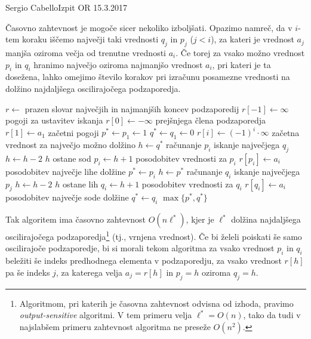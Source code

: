 \begin{naloga}{Sergio Cabello}{Izpit OR 15.3.2017}
\begin{odgovor}
Časovno zahtevnost je mogoče sicer nekoliko izboljšati.
Opazimo namreč, da v $i$-tem koraku
iščemo največji taki vrednosti $q_j$ in $p_j$ ($j < i$),
za kateri je vrednost $a_j$ manjša oziroma večja od trenutne vrednosti $a_i$.
Če torej za vsako možno vrednost $p_i$ in $q_i$
hranimo največjo oziroma najmanjšo vrednost $a_i$,
pri kateri je ta dosežena,
lahko omejimo število korakov pri izračunu posamezne vrednosti
na dolžino najdaljšega oscilirajočega podzaporedja.
\begin{small}
\begin{algorithmic}
	\State $r \gets$ prazen slovar največjih in najmanjših koncev podzaporedij
	\State $r[-1] \gets \infty$ \hfill pogoji za ustavitev iskanja
	\State $r[0] \gets -\infty$ \hfill prejšnjega člena podzaporedja
	\State $r[1] \gets a_1$ \hfill začetni pogoji
	\State $p^* \gets p_1 \gets 1$
	\State $q^* \gets q_1 \gets 0$
		\State $r[i] \gets (-1)^i \cdot \infty$
			\hfill začetna vrednost za največjo možno dolžino
		\State $h \gets q^*$ \hfill računanje $p_i$
		 \hfill iskanje največjega $q_j$
			\State $h \gets h - 2$ \hfill $h$ ostane sod
		\EndWhile
		\State $p_i \gets h + 1$
		 \hfill posodobitev vrednosti za $p_i$
			\State $r[p_i] \gets a_i$
		\EndIf
		 \hfill posodobitev največje lihe dolžine
			\State $p^* \gets p_i$
		\EndIf
		\State $h \gets p^*$ \hfill računanje $q_i$
		 \hfill iskanje največjega $p_j$
			\State $h \gets h - 2$ \hfill $h$ ostane lih
		\EndWhile
		\State $q_i \gets h + 1$
		 \hfill posodobitev vrednosti za $q_i$
			\State $r[q_i] \gets a_i$
		\EndIf
		 \hfill posodobitev največje sode dolžine
			\State $q^* \gets q_i$
		\EndIf
	\EndFor
	\State \Return $\max\{p^*, q^*\}$
\EndFunction
\end{algorithmic}
\end{small}
Tak algoritem ima časovno zahtevnost $O(n\ell^*)$,
kjer je $\ell^*$ dolžina najdaljšega oscilirajočega podzaporedja\footnote{%
Algoritmom, pri katerih je časovna zahtevnost odvisna od izhoda,
pravimo {\em output-sensitive} algoritmi.
V tem primeru velja $\ell^* = O(n)$,
tako da tudi v najslabšem primeru zahtevnost algoritma ne preseže $O(n^2)$.%
}
(tj., vrnjena vrednost).
Če bi želeli poiskati še samo oscilirajoče podzaporedje,
bi si morali tekom algoritma za vsako vrednost $p_i$ in $q_i$
beležiti še indeks predhodnega elementa v podzaporedju,
za vsako vrednost $r[h]$ pa še indeks $j$,
za katerega velja $a_j = r[h]$ in $p_j = h$ oziroma $q_j = h$.
\end{odgovor}
\end{naloga}

